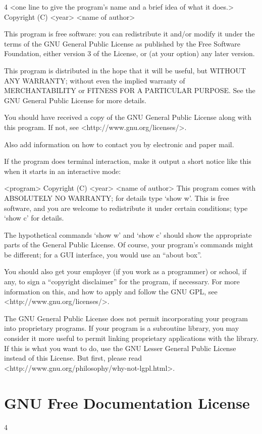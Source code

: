 \documentclass[fontsize=11pt,paper=A4,BCOR=12mm,DIV=13,open=any,listof=totoc,toc=flat]{scrbook}
\begin{document}
{\begin{multicols}{4}
    <one line to give the program's name and a brief idea of what it does.>
    Copyright (C) <year>  <name of author>

    This program is free software: you can redistribute it and/or modify
    it under the terms of the GNU General Public License as published by
    the Free Software Foundation, either version 3 of the License, or
    (at your option) any later version.

    This program is distributed in the hope that it will be useful,
    but WITHOUT ANY WARRANTY; without even the implied warranty of
    MERCHANTABILITY or FITNESS FOR A PARTICULAR PURPOSE.  See the
    GNU General Public License for more details.

    You should have received a copy of the GNU General Public License
    along with this program.  If not, see <http://www.gnu.org/licenses/>.

Also add information on how to contact you by electronic and paper mail.

If the program does terminal interaction, make it output a short notice like this when it starts in an interactive mode:

    <program>  Copyright (C) <year>  <name of author>
    This program comes with ABSOLUTELY NO WARRANTY; for details type `show w'.
    This is free software, and you are welcome to redistribute it
    under certain conditions; type `show c' for details.

The hypothetical commands `show w' and `show c' should show the appropriate parts of the General Public License. Of course, your program's commands might be different; for a GUI interface, you would use an “about box”.

You should also get your employer (if you work as a programmer) or school, if any, to sign a “copyright disclaimer” for the program, if necessary. For more information on this, and how to apply and follow the GNU GPL, see <http://www.gnu.org/licenses/>.

The GNU General Public License does not permit incorporating your program into proprietary programs. If your program is a subroutine library, you may consider it more useful to permit linking proprietary applications with the library. If this is what you want to do, use the GNU Lesser General Public License instead of this License. But first, please read <http://www.gnu.org/philosophy/why-not-lgpl.html>.
\end{multicols}

\section{GNU Free Documentation License}
\begin{multicols}{4}


\end{multicols}}
\end{document}

